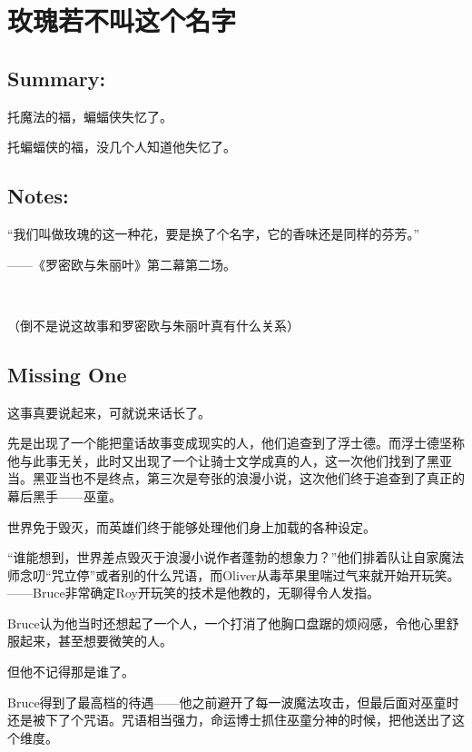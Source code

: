 \documentclass[../main.tex]{subfiles}
\begin{document}
\pagestyle{mystyle}

\chapter{玫瑰若不叫这个名字}
\vspace{3cm}


\section*{Summary:}

托魔法的福，蝙蝠侠失忆了。

托蝙蝠侠的福，没几个人知道他失忆了。

\section*{Notes:}

“我们叫做玫瑰的这一种花，要是换了个名字，它的香味还是同样的芬芳。”

\hfill——《罗密欧与朱丽叶》第二幕第二场。

~\

（倒不是说这故事和罗密欧与朱丽叶真有什么关系）

\newpage

\setcounter{section}{0}

\section{Missing One}

这事真要说起来，可就说来话长了。

先是出现了一个能把童话故事变成现实的人，他们追查到了浮士德。而浮士德坚称他与此事无关，此时又出现了一个让骑士文学成真的人，这一次他们找到了黑亚当。黑亚当也不是终点，第三次是夸张的浪漫小说，这次他们终于追查到了真正的幕后黑手——巫童。

世界免于毁灭，而英雄们终于能够处理他们身上加载的各种设定。

“谁能想到，世界差点毁灭于浪漫小说作者蓬勃的想象力？”他们排着队让自家魔法师念叨“咒立停”或者别的什么咒语，而Oliver从毒苹果里喘过气来就开始开玩笑。——Bruce非常确定Roy开玩笑的技术是他教的，无聊得令人发指。

Bruce认为他当时还想起了一个人，一个打消了他胸口盘踞的烦闷感，令他心里舒服起来，甚至想要微笑的人。

但他不记得那是谁了。

Bruce得到了最高档的待遇——他之前避开了每一波魔法攻击，但最后面对巫童时还是被下了个咒语。咒语相当强力，命运博士抓住巫童分神的时候，把他送出了这个维度。
\end{document}
